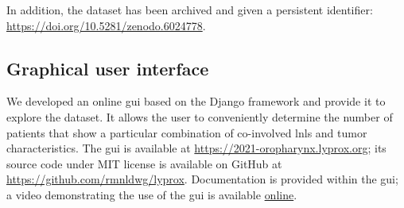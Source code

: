 \documentclass[\relativeRoot/main.tex]{subfiles}
\begin{document}
In addition, the dataset has been archived and given a persistent identifier: \url{https://doi.org/10.5281/zenodo.6024778}.

\subsection*{Graphical user interface}

We developed an online \gls{gui} based on the Django framework \cite{noauthor_django_2021} and provide it to explore the dataset. It allows the user to conveniently determine the number of patients that show a particular combination of co-involved \glspl{lnl} and tumor characteristics. The \gls{gui} is available at \url{https://2021-oropharynx.lyprox.org}; its source code under MIT license is available on GitHub at \url{https://github.com/rmnldwg/lyprox}. Documentation is provided within the \gls{gui}; a video demonstrating the use of the \gls{gui} is available \href{https://www.sciencedirect.com/science/article/pii/S0167814022000615#s0100}{online}.
\end{document}
